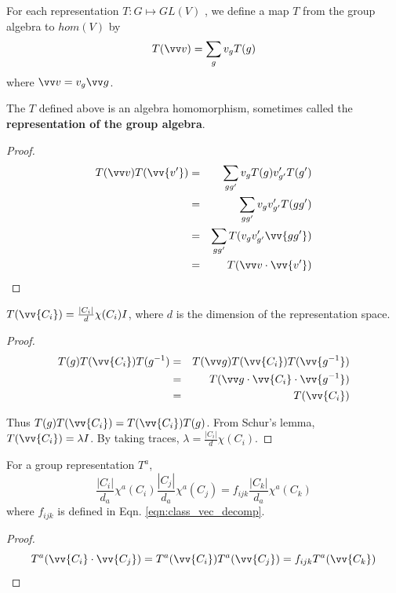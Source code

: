 \documentclass[12pt]{book}
\begin{document}
	\begin{definition}
	For each representation $T:G\mapsto GL(V)$ , we define a map $T$ from the group algebra to $hom(V)$ by
	\begin{equation}
		T(\vv v)=\sum_gv_gT(g)
	\end{equation}
	where $\vv v=v_g\vv g$.
	\end{definition}

\begin{lemma}
		The $T$ defined above is an algebra homomorphism, sometimes called the \textbf{representation of the group algebra}.
\end{lemma}
\begin{proof}
	\begin{eqnarray}
		T(\vv v)T(\vv{v'})&=&\sum_{gg'}v_gT(g)v'_{g'}T(g')\\
		&=&\sum_{gg'}v_gv'_{g'}T(gg')\\
		&=&\sum_{gg'}T(v_gv'_{g'}\vv{gg'})\\
		&=&T(\vv v\cdot\vv {v'})
	\end{eqnarray}
\end{proof}
\begin{lemma}
		$T(\vv{C_i})=\frac{|C_i|}{d}\chi(C_i) I$, where $d$ is the dimension of the representation space.
\end{lemma}
\begin{proof}
	\begin{eqnarray}
		T(g)T(\vv{C_i})T(g^{-1})&=&T(\vv g)T(\vv{C_i})T(\vv{g^{-1}})\\
		&=&T(\vv g\cdot\vv{C_i}\cdot\vv{g^{-1}})\\
		&=&T(\vv{C_i})
	\end{eqnarray}
	
	Thus $T(g)T(\vv{C_i})=T(\vv{C_i})T(g)$. From Schur's lemma, $T(\vv{C_i})=\lambda I$. By taking traces, $\lambda =\frac{|C_i|}{d}\chi(C_i)$.
\end{proof}
	
\begin{lemma}
	For a group representation $T^a$,
	\begin{equation}
		\frac{|C_i|}{d_a}\chi^a(C_i)\frac{|C_j|}{d_a}\chi^a(C_j)=f_{ijk}\frac{|C_k|}{d_a}\chi^a(C_k)\label{eqn:character}
	\end{equation}
	where $f_{ijk}$ is defined in Eqn. \ref{eqn:class_vec_decomp}.
\end{lemma}
\begin{proof}
	\begin{equation}
		T^a(\vv{C_i}\cdot\vv{C_j})=T^a(\vv{C_i})T^a(\vv{C_j})=f_{ijk}T^a(\vv{C_k})
	\end{equation}
\end{proof}
	
\end{document}
